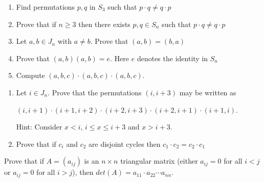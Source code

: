 \documentclass[12pt,letterpaper,cm]{hmcpset}
\begin{document}

\begin{problem}[A1]
    \begin{enumerate}
        \item Find permutations $p,q$ in $S_3$ such that $p\cdot q \neq q\cdot p$
        \item Prove that if $n\geq 3$ then there exists $p,q \in S_n$ such that $p\cdot q \neq q\cdot p$
        \item Let $a,b\in J_n$ with $a\neq b$. Prove that $(a,b) = (b,a)$
        \item Prove that $(a,b)(a,b) = e$. Here $e$ denotes the identity in $S_n$
        \item Compute $(a,b,c)\cdot(a,b,c)\cdot(a,b,c)$.
    \end{enumerate}
 \end{problem}

\begin{solution}
    
\end{solution}

\pagebreak

\begin{problem}[A2]
    \begin{enumerate}
        \item Let $i\in J_n$. Prove that the permutations $(i,i+3)$ may be written as
        \begin{center}
            $(i,i+1)\cdot(i+1,i+2)\cdot(i+2,i+3)\cdot(i+2,i+1)\cdot(i+1,i)$.\\
        \end{center}
        Hint: Consider $x<i$, $i\leq x \leq i+3$ and $x>i+3$.
        \item Prove that if $c_i$ and $c_2$ are disjoint cycles then $c_1\cdot c_2 = c_2 \cdot c_1$
    \end{enumerate}
\end{problem}

\begin{solution}

\end{solution}

\pagebreak

\begin{problem}[A3]
    Prove that if $A=(a_{ij})$ is an $n \times n$ triangular matrix (either $a_{ij} = 0$ for all $i<j$ or $a_{ij}=0$ for all $i>j$), then $det(A) = a_{11}\cdot a_{22} \cdots a_{nn}$.
\end{problem}
\end{document}
